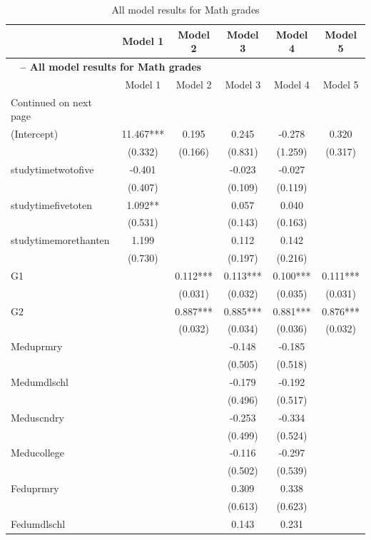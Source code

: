 \documentclass[12pt,english]{article}
\begin{document}
\clearpage
\begin{longtable}[c]{lccccc}
\caption{All model results for Math grades} \label{tab:6} \\
\hline 
 & Model 1 & Model 2 & Model 3 & Model 4 & Model 5\\
\endfirsthead
\multicolumn{5}{4}{{\bfseries \tablename\ \thetable{} -- All model results for Math grades}} \\
\hline 
  & Model 1 & Model 2 & Model 3 & Model 4 & Model 5\\
\endhead
\hline {{Continued on next page}} \\ \hline
\endfoot
\hline \hline
\endlastfoot
(Intercept) & 11.467*** & 0.195 & 0.245 & -0.278 & 0.320\\
 & (0.332) & (0.166) & (0.831) & (1.259) & (0.317)\\
studytimetwotofive & -0.401 &  & -0.023 & -0.027 & \\
 & (0.407) &  & (0.109) & (0.119) & \\
studytimefivetoten & 1.092** &  & 0.057 & 0.040 & \\
 & (0.531) &  & (0.143) & (0.163) & \\
studytimemorethanten & 1.199 &  & 0.112 & 0.142 & \\
 & (0.730) &  & (0.197) & (0.216) & \\
G1 &  & 0.112*** & 0.113*** & 0.100*** & 0.111***\\
 &  & (0.031) & (0.032) & (0.035) & (0.031)\\
G2 &  & 0.887*** & 0.885*** & 0.881*** & 0.876***\\
 &  & (0.032) & (0.034) & (0.036) & (0.032)\\
Meduprmry &  &  & -0.148 & -0.185 & \\
 &  &  & (0.505) & (0.518) & \\
Medumdlschl &  &  & -0.179 & -0.192 & \\
 &  &  & (0.496) & (0.517) & \\
Meduscndry &  &  & -0.253 & -0.334 & \\
 &  &  & (0.499) & (0.524) & \\
Meducollege &  &  & -0.116 & -0.297 & \\
 &  &  & (0.502) & (0.539) & \\
Feduprmry &  &  & 0.309 & 0.338 & \\
 &  &  & (0.613) & (0.623) & \\
Fedumdlschl &  &  & 0.143 & 0.231 & \\

\end{longtable}
\end{document}
